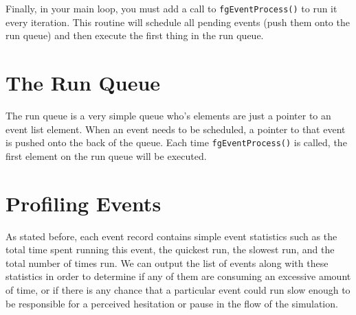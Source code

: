 \documentclass[12pt]{article}
\begin{document}
Finally, in your main loop, you must add a call to
\texttt{fgEventProcess()} to run it every iteration.  This routine
will schedule all pending events (push them onto the run queue) and
then execute the first thing in the run queue.

\section{The Run Queue}

The run queue is a very simple queue who's elements are just a pointer
to an event list element.  When an event needs to be scheduled, a
pointer to that event is pushed onto the back of the queue.  Each time
\texttt{fgEventProcess()} is called, the first element on the run
queue will be executed.

\section{Profiling Events}

As stated before, each event record contains simple event statistics
such as the total time spent running this event, the quickest run, the
slowest run, and the total number of times run.  We can output the
list of events along with these statistics in order to determine if any of
them are consuming an excessive amount of time, or if there is any
chance that a particular event could run slow enough to be responsible
for a perceived hesitation or pause in the flow of the simulation.
\end{document}
